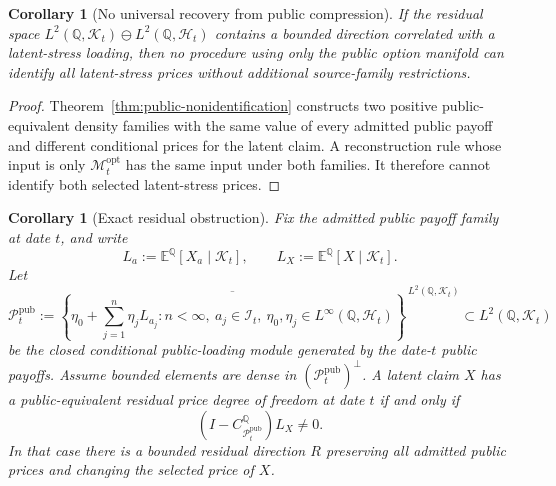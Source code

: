 \documentclass[11pt,a4paper]{amsart}
\theoremstyle{plain}
\newtheorem{corollary}[theorem]{Corollary}
\theoremstyle{definition}
\theoremstyle{remark}
\newcommand{\QQ}{\mathbb{Q}}
\newcommand{\EE}{\mathbb{E}}
\newcommand{\cH}{\mathcal{H}}
\newcommand{\cI}{\mathcal{I}}
\newcommand{\cK}{\mathcal{K}}
\newcommand{\cM}{\mathcal{M}}
\newcommand{\cP}{\mathcal{P}}
\begin{document}
\begin{corollary}[No universal recovery from public compression]\label{cor:no-universal-recovery}
If the residual space \(L^2(\QQ,\cK_t)\ominus L^2(\QQ,\cH_t)\) contains a bounded direction
correlated with a latent-stress loading, then no procedure using only the public option manifold
can identify all latent-stress prices without additional source-family restrictions.
\end{corollary}

\begin{proof}
Theorem~\ref{thm:public-nonidentification} constructs two positive public-equivalent density
families with the same value of every admitted public payoff and different conditional prices for
the latent claim.  A reconstruction rule whose input is only \(\cM_t^{\mathrm{opt}}\) has the
same input under both families.  It therefore cannot identify both selected latent-stress prices.
\end{proof}

\begin{corollary}[Exact residual obstruction]\label{cor:exact-residual-obstruction}
Fix the admitted public payoff family at date \(t\), and write
\[
        L_a:=\EE^\QQ[X_a\mid\cK_t],
        \qquad
        L_X:=\EE^\QQ[X\mid\cK_t].
\]
Let
\[
        \cP_t^{\mathrm{pub}}
        :=
        \overline{\left\{
        \eta_0+\sum_{j=1}^n\eta_j L_{a_j}:
        n<\infty,\ a_j\in\cI_t,\ \eta_0,\eta_j\in L^\infty(\QQ,\cH_t)
        \right\}}^{\,L^2(\QQ,\cK_t)}
        \subset L^2(\QQ,\cK_t)
\]
be the closed conditional public-loading module generated by the date-\(t\) public payoffs.
Assume bounded elements are dense in \((\cP_t^{\mathrm{pub}})^\perp\).  A latent claim \(X\)
has a public-equivalent residual price degree of freedom at date \(t\) if and only if
\[
        (I-C_{\cP_t^{\mathrm{pub}}}^\QQ)L_X\ne0.
\]
In that case there is a bounded residual direction \(R\) preserving all admitted public prices
and changing the selected price of \(X\).
\end{corollary}
\end{document}
